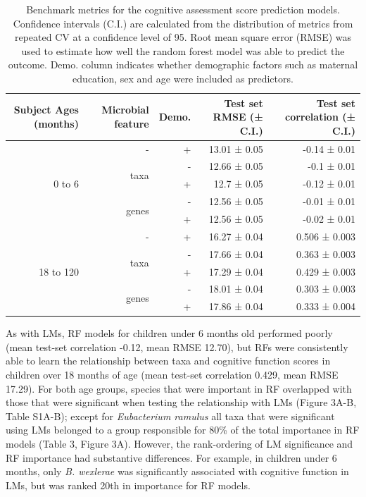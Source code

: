 \documentclass{article}
\begin{document}
\begin{table}[!h]
    \begin{center}
    \begin{tabular}{|r|r|r|r|r|}
      \hline\hline
      \textbf{Subject Ages (months)} & \textbf{Microbial feature} & \textbf{Demo.} & \textbf{Test set RMSE (± C.I.)} & \textbf{Test set correlation (± C.I.)} \\\hline
      \multirow{5}{*}{0 to 6} & - & + & 13.01 ± 0.05 & -0.14 ± 0.01 \\ \cline{2-5}
            & \multirow{2}{*}{taxa} & - & 12.66 ± 0.05 & -0.1 ± 0.01 \\ \cline{3-5}
            &       & + & 12.7 ± 0.05 & -0.12 ± 0.01 \\ \cline{2-5}
            & \multirow{2}{*}{genes} & - & 12.56 ± 0.05 & -0.01 ± 0.01 \\ \cline{3-5}
            &       & + & 12.56 ± 0.05 & -0.02 ± 0.01 \\ \cline{1-5}
      \multirow{5}{*}{18 to 120} & - & + & 16.27 ± 0.04 & 0.506 ± 0.003 \\ \cline{2-5}
            & \multirow{2}{*}{taxa} & - & 17.66 ± 0.04 & 0.363 ± 0.003 \\ \cline{3-5}
            &       & + & 17.29 ± 0.04 & 0.429 ± 0.003 \\ \cline{2-5}
            & \multirow{2}{*}{genes} & - & 18.01 ± 0.04 & 0.303 ± 0.003 \\ \cline{3-5}
            &       & + & 17.86 ± 0.04 & 0.333 ± 0.004 \\\hline\hline
    \end{tabular}
    \caption{\label{tab:rfbench}Benchmark metrics for the cognitive assessment score
    prediction models. Confidence intervals (C.I.) are calculated from the
    distribution of metrics from repeated CV at a confidence level of 95.
    Root mean square error (RMSE) was used to estimate how well the random forest model was able to predict the outcome.
    Demo. column indicates whether demographic factors such as maternal education, sex and age were included as predictors.}
    \end{center}
\end{table}

As with LMs, RF models for children under 6 months old
performed poorly (mean test-set correlation -0.12, mean RMSE 12.70),
but RFs were consistently able to learn the relationship between taxa
and cognitive function scores in children over 18 months of age (mean
test-set correlation 0.429, mean RMSE 17.29). For both age groups,
species that were important in RF overlapped with those that were
significant when testing the relationship with LMs (Figure
3A-B, Table S1A-B); except for \emph{Eubacterium ramulus}
all taxa that were significant using LMs belonged to a group
responsible for 80\% of the total importance in RF models
(Table 3, Figure 3A).
However, the rank-ordering of LM significance and RF importance
had substantive differences. For example, in children under 6 months,
only \emph{B. wexlerae} was significantly associated with cognitive function in LMs, but
was ranked 20th in importance for RF models. 
\end{document}
